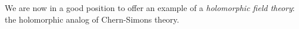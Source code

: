 \documentclass[11pt]{amsart}
\begin{document}
We are now in a good position to offer an example of a {\em holomorphic field theory}:
the holomorphic analog of Chern-Simons theory.
 
%
\end{document}
